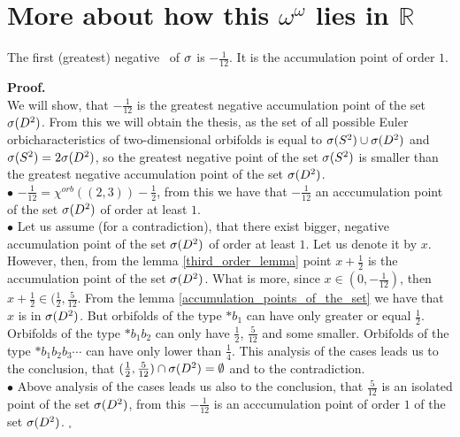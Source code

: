 


\section{More about how this $\omega^\omega$ lies in $\mathbb{R}$}
\begin{observation}
The first (greatest) negative \apots\ of ${\sigma}$ is 
$-\frac{1}{12}$. It is the accumulation point of order $1$. 
\end{observation}
\noindent\textbf{Proof.} \\
We will show, that $-\frac{1}{12}$ is the greatest negative accumulation point of the set ${{\sigma}(D^2)}$. 
From this we will obtain the thesis, as the set of all possible Euler orbicharacteristics 
of two-dimensional orbifolds is equal to ${{\sigma}(S^2)} \cup {{\sigma}(D^2)}$ and ${{\sigma}(S^2)} = 2{{\sigma}(D^2)}$, so 
the greatest negative point of the set ${{\sigma}(S^2)}$ is smaller than the greatest negative accumulation 
point of the set ${{\sigma}(D^2)}$. \\
$\bullet$ $-\frac{1}{12}=\chi^{orb}((2,3))-\frac{1}{2}$, from this we have that $-\frac{1}{12}$ 
an acccumulation point of the set ${{\sigma}(D^2)}$ of order at least $1$. \\
$\bullet$ Let us assume (for a contradiction), that there exist bigger, negative 
accumulation point of the set ${{\sigma}(D^2)}$ of order at least $1$. Let us denote it by $x$. \\
However, then, from the lemma \ref{third_order_lemma} point $x+\frac{1}{2}$ is the accumulation 
point of the set ${{\sigma}(D^2)}$. What is more, since $x\in (0, -\frac{1}{12})$, then $x+\frac{1}{2} 
\in (\frac{1}{2}, \frac{5}{12}$. From the lemma \ref{accumulation_points_of_the_set} we 
have that $x$ is in ${{\sigma}(D^2)}$. But orbifolds of the type $\ast b_1$ can have \Eoc only greater or 
equal $\frac{1}{2}$. Orbifolds of the type $\ast b_1b_2$ can only have \Eoc $\frac{1}{2}$, 
$\frac{5}{12}$ and some smaller. Orbifolds of the type $\ast b_1b_2b_3\cdots$ can have \Eoc only 
lower than $\frac{1}{4}$. This analysis of the cases leads us to the conclusion, that 
$(\frac{1}{2},\frac{5}{12})\cap {{\sigma}(D^2)}=\emptyset$ and to the contradiction. \\
$\bullet$ Above analysis of the cases leads us also to the conclusion, that $\frac{5}{12}$ 
is 
an isolated point of the set ${{\sigma}(D^2)}$, from this $-\frac{1}{12}$ is an acccumulation point 
of order $1$ of the set ${{\sigma}(D^2)}$. $_\square$ \\ 
 








